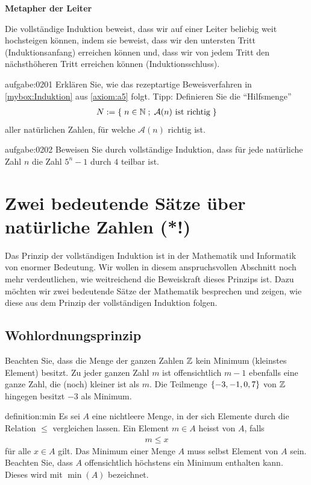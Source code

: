 \begin{mdframed}[backgroundcolor=NavajoWhite!30,nobreak=true]\label{mdframed:Metapher}
\textbf{Metapher der Leiter}
\vspace{0.2cm}

\noindent
Die vollständige Induktion beweist, dass wir auf einer Leiter beliebig weit hochsteigen können, indem sie beweist, dass wir den untersten Tritt (Induktionsanfang) erreichen
können und, dass wir von jedem Tritt den nächsthöheren Tritt erreichen können (Induktionsschluss).
\end{mdframed}

\begin{aufgabe}{aufgabe:0201}
Erklären Sie, wie das rezeptartige Beweisverfahren in \cref{mybox:Induktion} aus \cref{axiom:a5} folgt. Tipp: Definieren Sie die \enquote{Hilfsmenge}
\begin{align*}
    N := \left\{\;n\in\mathbb{N} \; ; \; \text{$\mathcal{A}(n)$ ist richtig} \;\right\}
\end{align*}
aller natürlichen Zahlen, für welche $\mathcal{A}(n)$ richtig ist.
\end{aufgabe}

\begin{aufgabe}{aufgabe:0202}
Beweisen Sie durch vollständige Induktion, dass für jede natürliche Zahl $n$ die Zahl $5^n-1$ durch $4$ teilbar ist.
\end{aufgabe}

\section{Zwei bedeutende Sätze über natürliche Zahlen (*!)}
Das Prinzip der vollständigen Induktion ist in der Mathematik und Informatik von enormer Bedeutung. Wir wollen in diesem anspruchsvollen Abschnitt noch mehr verdeutlichen, wie weitreichend die Beweiskraft dieses Prinzips ist. Dazu möchten wir zwei bedeutende Sätze der Mathematik besprechen und zeigen, wie diese aus dem Prinzip der vollständigen Induktion folgen.
\subsection{Wohlordnungsprinzip}
Beachten Sie, dass die Menge der ganzen Zahlen $\mathbb{Z}$ kein Minimum (kleinstes Element) besitzt. Zu jeder ganzen Zahl $m$ ist offensichtlich $m-1$ ebenfalls eine ganze Zahl, die (noch) kleiner ist als $m$. Die Teilmenge $\left\{-3,-1,0,7\right\}$ von $\mathbb{Z}$ hingegen besitzt $-3$ als Minimum.
\begin{definition}[ Minimum]{definition:min}
Es sei $A$ eine nichtleere Menge, in der sich Elemente durch die Relation $\leq$ vergleichen lassen. Ein Element $m\in A$ heisst  von $A$, falls
\begin{align*}
    m \leq x
\end{align*}
für alle $x\in A$ gilt. Das Minimum einer Menge $A$ muss selbst Element von $A$ sein. Beachten Sie, dass $A$ offensichtlich höchstens ein Minimum enthalten kann. Dieses wird mit $\min(A)$ bezeichnet.
\end{definition}

